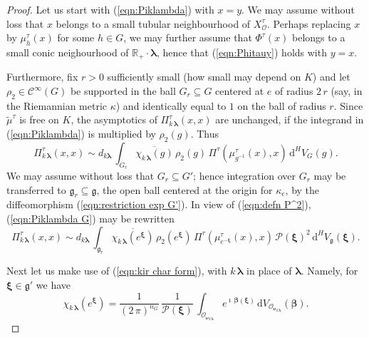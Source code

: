 \documentclass[12pt,a4paper]{article}
\theoremstyle{plain}
\theoremstyle{definition}
\begin{document}
\begin{proof}
Let us start with (\ref{eqn:Piklambda}) with 
$x=y$.
We may assume without loss that $x$ belongs to a small tubular
neighbourhood of $X^\tau_{\mathcal{O}}$. 
Perhaps replacing
$x$ by $\mu^\tau_h(x)$ for some $h\in G$, we may further 
assume that $\Phi^\tau(x)$ belongs to a small conic neighourhood of $\mathbb{R}_+\cdot \boldsymbol{\lambda}$,
hence that (\ref{eqn:Phitauy}) holds with $y=x$.


Furthermore, fix $r>0$ sufficiently small
(how small may depend on $K$) and 
let $\rho_2\in \mathcal{C}^\infty(G)$
be supported in the ball
$G_r\subseteq G$
centered at $e$ of radius
$2\,r$ (say, in the Riemannian metric
$\kappa$) and identically equal to $1$ on the ball of
radius $r$. Since $\tilde{\mu}^\tau$ is free on $K$,
the asymptotics of 
$\Pi^\tau_{k\,\boldsymbol{\lambda}}(x,x)$ are unchanged, 
if the integrand in (\ref{eqn:Piklambda}) is multiplied
by $\rho_2(g)$. Thus
\begin{equation}
\label{eqn:Piklambda G}
\Pi^\tau_{k\,\boldsymbol{\lambda}}(x,x)\sim
d_{k\boldsymbol{\lambda}}\,
\int_{G_r} \overline{\chi_{k\,\boldsymbol{\lambda}}(g)}\,
\rho_2(g)\,
\Pi^\tau
\left(\mu^\tau_{g^{-1}}(x),x   \right)\,
\mathrm{d}^HV_G(g).
\end{equation}
%
We may assume without loss that $G_r\subseteq G'$; hence
integration over $G_r$ may be transferred to 
$\mathfrak{g}_r\subseteq \mathfrak{g}$, the open ball
centered at the origin for $\kappa_e$, by the diffeomorphism
(\ref{eqn:restriction exp G'}). In view of  
(\ref{eqn:defn P^2}), (\ref{eqn:Piklambda G}) may be rewritten
%
\begin{equation}
\label{eqn:Piklambda g}
\Pi^\tau_{k\,\boldsymbol{\lambda}}(x,x)\sim
d_{k\boldsymbol{\lambda}}\,
\int_{\mathfrak{g}_r} \overline{\chi_{k\,\boldsymbol{\lambda}}(e^{\boldsymbol{\xi}})}\,
\rho_2(e^{\boldsymbol{\xi}})\,
\Pi^\tau
\left(\mu^\tau_{e^{-\boldsymbol{\xi}}}(x),x   \right)\,
\mathcal{P}(\boldsymbol{\xi})^2\,
\mathrm{d}^HV_{\mathfrak{g}}(\boldsymbol{\xi}).
\end{equation}

Next let us make use of (\ref{eqn:kir char form}), with
$k\,\boldsymbol{\lambda}$ in place of $\boldsymbol{\lambda}$.
Namely, for $\boldsymbol{\xi}\in \mathfrak{g}'$ we have
\begin{equation}
\label{eqn:kir char form k}
\chi_{k\,\boldsymbol{\lambda}}
\left(e^{\boldsymbol{\xi}}\right)
=\frac{1}{(2\,\pi)^{n_G}}\,
\frac{1}{\mathcal{P}(\boldsymbol{\xi})}\,
\int_{\mathcal{O}_{\boldsymbol{\nu}_{k\,\boldsymbol{\lambda}}}}
e^{\imath\,\boldsymbol{\beta}(\boldsymbol{\xi})}\,
\mathrm{d}
V_{\mathcal{O}_{\boldsymbol{\nu}_{k\,\boldsymbol{\lambda}}}}
(\boldsymbol{\beta}).
\end{equation}


\end{proof}
\end{document}
